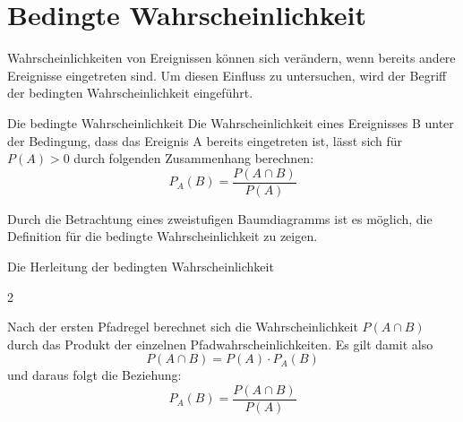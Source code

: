 \section{Bedingte Wahrscheinlichkeit}
Wahrscheinlichkeiten von Ereignissen können sich verändern, wenn bereits andere Ereignisse eingetreten sind. Um diesen Einfluss zu untersuchen, wird der Begriff der bedingten Wahrscheinlichkeit eingeführt.
\begin{defi}{Die bedingte Wahrscheinlichkeit}{}
   Die Wahrscheinlichkeit eines Ereignisses B unter der Bedingung, dass das Ereignis A bereits eingetreten ist, lässt sich für $P(A)>0$ durch folgenden Zusammenhang berechnen: $$P_A(B) = \dfrac{P(A\cap B)}{P(A)}$$   
\end{defi}
Durch die Betrachtung eines zweistufigen Baumdiagramms ist es möglich, die Definition für die bedingte Wahrscheinlichkeit zu zeigen.
\begin{merke*}{Die Herleitung der bedingten Wahrscheinlichkeit}{}
\begin{multicols}{2}

Nach der ersten Pfadregel berechnet sich die Wahrscheinlichkeit $P(A\cap B)$ durch das Produkt der einzelnen Pfadwahrscheinlichkeiten. Es gilt damit also $$P(A\cap B) = P(A) \cdot P_{A}(B)$$ und daraus folgt die Beziehung: $$P_{A}(B) = \dfrac{P(A \cap B)}{P(A)}$$
\end{multicols}
\end{merke*}
